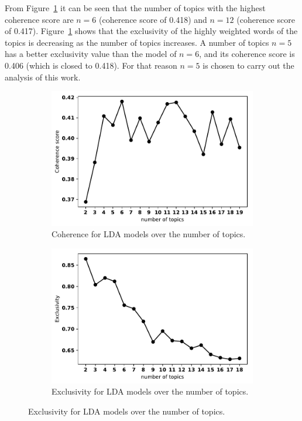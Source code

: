 \documentclass{article}
\theoremstyle{definition}
\begin{document}
From Figure~\ref{fig:coherence_value_over_number_of_topics} it can be seen that
the number of topics with the highest coherence score are $n=6$ (coherence score
of 0.418) and $n=12$ (coherence score of 0.417).
Figure~\ref{fig:coherence_value_over_number_of_topics} shows that the
exclusivity of the highly weighted words of the topics is decreasing as the number
of topics increases. A number of topics $n=5$ has a better exclusivity value
than the model of $n=6$, and its coherence score is 0.406 (which is closed to
0.418). For that reason $n=5$ is chosen to carry out the analysis of this work.


\begin{figure}[!hbtp]
    \centering
    \begin{subfigure}{.45\textwidth}
        \centering
        \includegraphics[width=\textwidth]{./assets/images/coherence_values.pdf}
        \caption{Coherence for LDA models over the number of topics.}
        \label{fig:coherence_value_over_number_of_topics}
    \end{subfigure}\hfill
    \begin{subfigure}{.45\textwidth}
        \centering
        \includegraphics[width=\textwidth]{./assets/images/exclusivity_values.pdf}
        \caption{Exclusivity for LDA models over the number of topics.}
        \label{fig:exclusivity_value_over_number_of_topics}
    \end{subfigure}
\end{figure}
\end{document}
